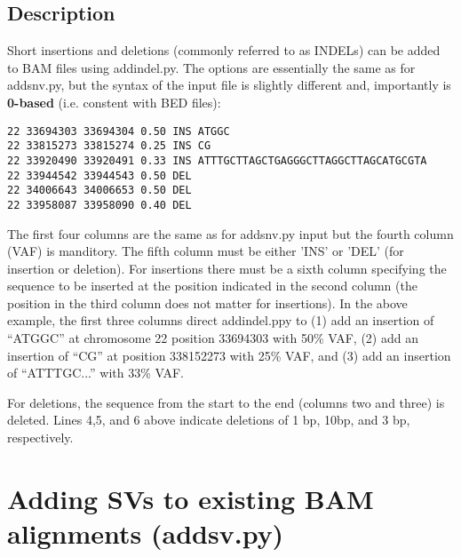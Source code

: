 \documentclass[letterpaper,11pt]{article}
\begin{document}
\subsection{Description}
Short insertions and deletions (commonly referred to as INDELs) can be added to BAM files using addindel.py. The options are essentially the same as for addsnv.py, but the syntax of the input file is slightly different and, importantly is \textbf{0-based} (i.e. constent with BED files):

\begin{verbatim}
22 33694303 33694304 0.50 INS ATGGC
22 33815273 33815274 0.25 INS CG
22 33920490 33920491 0.33 INS ATTTGCTTAGCTGAGGGCTTAGGCTTAGCATGCGTA
22 33944542 33944543 0.50 DEL
22 34006643 34006653 0.50 DEL
22 33958087 33958090 0.40 DEL
\end{verbatim}

The first four columns are the same as for addsnv.py input but the fourth column (VAF) is manditory. The fifth column must be either 'INS' or 'DEL' (for insertion or deletion). For insertions there must be a sixth column specifying the sequence to be inserted at the position indicated in the second column (the position in the third column does not matter for insertions). In the above example, the first three columns direct addindel.ppy to (1) add an insertion of ``ATGGC'' at chromosome 22 position 33694303 with 50\% VAF, (2) add an insertion of ``CG'' at position 338152273 with 25\% VAF, and (3) add an insertion of ``ATTTGC...'' with 33\% VAF.

For deletions, the sequence from the start to the end (columns two and three) is deleted. Lines 4,5, and 6 above indicate deletions of 1 bp, 10bp, and 3 bp, respectively.

\section{Adding SVs to existing BAM alignments (addsv.py)}
\end{document}
